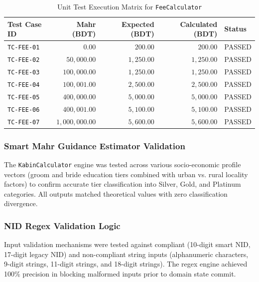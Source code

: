 \documentclass[12pt,a4paper]{article}
\begin{document}
	\begin{table}[h!]
		\centering
		\small
		\caption{Unit Test Execution Matrix for \texttt{FeeCalculator}}
		\label{tab:fee_test_matrix}
		\begin{tabularx}{\textwidth}{@{}l r r r l@{}}
			\toprule
			\textbf{Test Case ID} & \textbf{Mahr (BDT)} & \textbf{Expected (BDT)} & \textbf{Calculated (BDT)} & \textbf{Status} \\ \midrule
			\texttt{TC-FEE-01} & $0.00$ & $200.00$ & $200.00$ & PASSED \\
			\texttt{TC-FEE-02} & $50{,}000.00$ & $1{,}250.00$ & $1{,}250.00$ & PASSED \\
			\texttt{TC-FEE-03} & $100{,}000.00$ & $1{,}250.00$ & $1{,}250.00$ & PASSED \\
			\texttt{TC-FEE-04} & $100{,}001.00$ & $2{,}500.00$ & $2{,}500.00$ & PASSED \\
			\texttt{TC-FEE-05} & $400{,}000.00$ & $5{,}000.00$ & $5{,}000.00$ & PASSED \\
			\texttt{TC-FEE-06} & $400{,}001.00$ & $5{,}100.00$ & $5{,}100.00$ & PASSED \\
			\texttt{TC-FEE-07} & $1{,}000{,}000.00$ & $5{,}600.00$ & $5{,}600.00$ & PASSED \\ \bottomrule
		\end{tabularx}
	\end{table}
	
	\subsubsection{Smart Mahr Guidance Estimator Validation}
	The \texttt{KabinCalculator} engine was tested across various socio-economic profile vectors (groom and bride education tiers combined with urban vs. rural locality factors) to confirm accurate tier classification into Silver, Gold, and Platinum categories. All outputs matched theoretical values with zero classification divergence.
	
	\subsubsection{NID Regex Validation Logic}
	Input validation mechanisms were tested against compliant (10-digit smart NID, 17-digit legacy NID) and non-compliant string inputs (alphanumeric characters, 9-digit strings, 11-digit strings, and 18-digit strings). The regex engine achieved 100\% precision in blocking malformed inputs prior to domain state commit.
	
\end{document}
